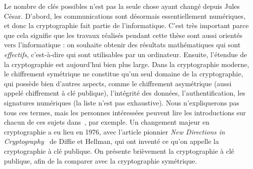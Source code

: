 Le nombre de clés possibles n'est pas la seule chose ayant changé depuis Jules
César.
D'abord, les communications sont désormais essentiellement numériques, et donc
la cryptographie fait partie de l'informatique. C'est très important parce que
cela signifie que les travaux réalisés pendant cette thèse sont aussi orientés
vers l'informatique : on souhaite obtenir des résultats mathématiques qui sont
\emph{effectifs}, c'est-à-dire qui sont utilisables par un ordinateur. Ensuite,
l'étendue de la cryptographie est aujourd'hui bien plus large. Dans la
cryptographie moderne, le chiffrement symétrique ne constitue qu'un seul domaine
de la cryptographie, qui possède bien d'autres aspects, comme le chiffrement
asymétrique (aussi appelé chiffrement à clé publique), l'intégrité des données,
l'authentification, les signatures numériques (la liste n'est pas exhaustive).
Nous n'expliquerons pas tous ces termes, mais les personnes intéressées peuvent
lire les introductions sur chacun de ces sujets dans~\cite{MVOV18}, par exemple.
Un changement majeur en cryptographie a eu lieu en 1976, avec l'article pionnier
\emph{New Directions in Cryptography}~\cite{DH76} de Diffie et Hellman, qui ont
inventé ce qu'on appelle la cryptographie à clé publique. On présente brièvement
la cryptographie à clé publique, afin de la comparer avec la cryptographie
symétrique.

